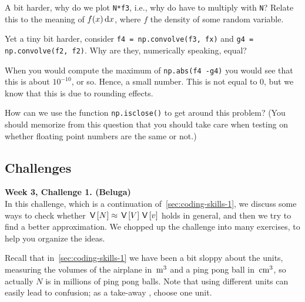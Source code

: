 \documentclass[assignments]{subfiles}
\begin{document}
\begin{exercise}
A bit harder, why do we plot \texttt{N*f3}, i.e., why do have to multiply with \texttt{N}? Relate this to the meaning of $f(x)\,\textrm{d}x$, where $f$ the density of some random variable.
\begin{solution}
\end{solution}
\end{exercise}

\begin{exercise}
Yet a tiny bit harder, consider \texttt{f4 = np.convolve(f3, fx)} and \texttt{g4 = np.convolve(f2, f2)}. Why are they, numerically speaking,  equal?
\begin{solution}
\end{solution}
\end{exercise}

\begin{exercise}
When you would compute the maximum of \texttt{np.abs(f4 -g4)} you would see that this is about $10^{-10}$, or so.
Hence, a small number.
This is not equal to 0, but we know that this is due to rounding effects.

How can we use the function \texttt{np.isclose()} to get around this problem?
(You should memorize from this question that you should take care when testing on whether floating point numbers are the same or not.)
\begin{solution}
\end{solution}
\end{exercise}



\subsection{Challenges}
\label{sec:challenges-1}

\textbf{Week 3, Challenge 1. (Beluga)} \\
In this challenge, which is a continuation of~\cref{sec:coding-skills-1}, we discuss some ways to check whether $\,\mathsf{V}\left[N\right] \approx \,\mathsf{V}\left[V\right] \,\mathsf{V}\left[v\right]$ holds in general, and then we try to find a better approximation. We chopped up the challenge into many exercises, to help you organize the ideas.


Recall that in~\cref{sec:coding-skills-1} we have been a bit sloppy about the units, measuring the volumes of the airplane in $\,\mathrm{m}^{3}$ and a ping pong ball in $\,\mathrm{cm}^{3}$, so actually $N$ is in millions of ping pong balls.
Note that using different units can easily lead to  confusion; as a take-away , choose one unit.
\end{document}
